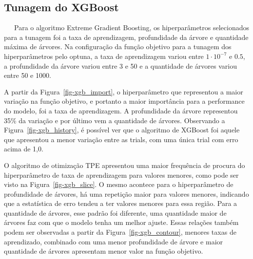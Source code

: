 \documentclass[
  12pt,
  a4paper,
]{scrreprt}
\begin{document}
\subsection{Tunagem do XGBoost}\label{tunagem-do-xgboost}

~~~Para o algoritmo Extreme Gradient Boosting, os hiperparâmetros
selecionados para a tunagem foi a taxa de aprendizagem, profundidade da
árvore e quantidade máxima de árvores. Na configuração da função
objetivo para a tunagem dos hiperparâmetros pelo optuna, a taxa de
aprendizagem variou entre \(1 \cdot 10^{-7}\) e \(0.5\), a profundidade
da árvore variou entre 3 e 50 e a quantidade de árvores variou entre 50
e 1000.

\vspace{12pt}

A partir da Figura~\ref{fig-xgb_import}, o hiperparâmetro que
representou a maior variação na função objetivo, e portanto a maior
importância para a performance do modelo, foi a taxa de aprendizagem. A
profundidade da árvore representou 35\% da variação e por último vem a
quantidade de árvores. Observando a Figura~\ref{fig-xgb_history}, é
possível ver que o algoritmo de XGBoost foi aquele que apresentou a
menor variação entre as trials, com uma única trial com erro acima de
1,0.

\vspace{12pt}

O algoritmo de otimização TPE apresentou uma maior frequência de procura
do hiperparâmetro de taxa de aprendizagem para valores menores, como
pode ser visto na Figura~\ref{fig-xgb_slice}. O mesmo acontece para o
hiperparâmetro de profundidade de árvores, há uma repetição maior para
valores menores, indicando que a estatística de erro tendeu a ter
valores menores para essa região. Para a quantidade de árvores, esse
padrão foi diferente, uma quantidade maior de árvores faz com que o
modelo tenha um melhor ajuste. Essas relações também podem ser
observadas a partir da Figura~\ref{fig-xgb_contour}, menores taxas de
aprendizado, combinado com uma menor profundidade de árvore e maior
quantidade de árvores apresentam menor valor na função objetivo.
\end{document}
